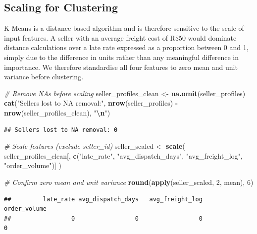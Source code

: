 \documentclass[
]{article}
\newenvironment{Shaded}{\begin{snugshade}}{\end{snugshade}}
\newcommand{\CommentTok}[1]{\textcolor[rgb]{0.56,0.35,0.01}{\textit{#1}}}
\newcommand{\DecValTok}[1]{\textcolor[rgb]{0.00,0.00,0.81}{#1}}
\newcommand{\FunctionTok}[1]{\textcolor[rgb]{0.13,0.29,0.53}{\textbf{#1}}}
\newcommand{\NormalTok}[1]{#1}
\newcommand{\OtherTok}[1]{\textcolor[rgb]{0.56,0.35,0.01}{#1}}
\newcommand{\SpecialCharTok}[1]{\textcolor[rgb]{0.81,0.36,0.00}{\textbf{#1}}}
\newcommand{\StringTok}[1]{\textcolor[rgb]{0.31,0.60,0.02}{#1}}
\begin{document}
\subsection{Scaling for Clustering}\label{scaling-for-clustering}

K-Means is a distance-based algorithm and is therefore sensitive to the
scale of input features. A seller with an average freight cost of R\$50
would dominate distance calculations over a late rate expressed as a
proportion between 0 and 1, simply due to the difference in units rather
than any meaningful difference in importance. We therefore standardise
all four features to zero mean and unit variance before clustering.

\begin{Shaded}
\begin{Highlighting}[]
\CommentTok{\# Remove NAs before scaling}
\NormalTok{seller\_profiles\_clean }\OtherTok{\textless{}{-}} \FunctionTok{na.omit}\NormalTok{(seller\_profiles)}
\FunctionTok{cat}\NormalTok{(}\StringTok{"Sellers lost to NA removal:"}\NormalTok{, }
    \FunctionTok{nrow}\NormalTok{(seller\_profiles) }\SpecialCharTok{{-}} \FunctionTok{nrow}\NormalTok{(seller\_profiles\_clean), }\StringTok{"}\SpecialCharTok{\textbackslash{}n}\StringTok{"}\NormalTok{)}
\end{Highlighting}
\end{Shaded}

\begin{verbatim}
## Sellers lost to NA removal: 0
\end{verbatim}

\begin{Shaded}
\begin{Highlighting}[]
\CommentTok{\# Scale features (exclude seller\_id)}
\NormalTok{seller\_scaled }\OtherTok{\textless{}{-}} \FunctionTok{scale}\NormalTok{(}
\NormalTok{  seller\_profiles\_clean[, }\FunctionTok{c}\NormalTok{(}\StringTok{"late\_rate"}\NormalTok{, }\StringTok{"avg\_dispatch\_days"}\NormalTok{,}
                              \StringTok{"avg\_freight\_log"}\NormalTok{, }\StringTok{"order\_volume"}\NormalTok{)]}
\NormalTok{)}

\CommentTok{\# Confirm zero mean and unit variance}
\FunctionTok{round}\NormalTok{(}\FunctionTok{apply}\NormalTok{(seller\_scaled, }\DecValTok{2}\NormalTok{, mean), }\DecValTok{6}\NormalTok{)}
\end{Highlighting}
\end{Shaded}

\begin{verbatim}
##         late_rate avg_dispatch_days   avg_freight_log      order_volume 
##                 0                 0                 0                 0
\end{verbatim}
\end{document}
